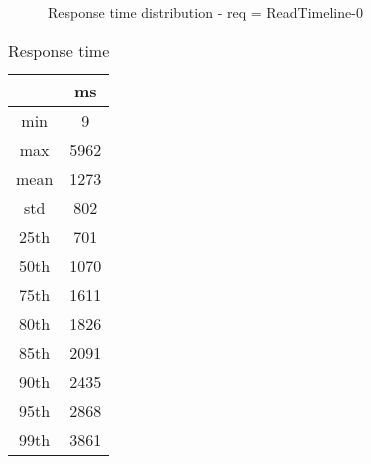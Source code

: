 \begin{minipage}{0.75\linewidth}
\begin{figure}[h]
\begin{adjustbox}{max width=1.0\linewidth, keepaspectratio}
  \end{adjustbox}
  \caption{Response time distribution - req = ReadTimeline-0}
\end{figure}
\end{minipage}\hfill\begin{minipage}{0.18\linewidth}
\begin{table}[h]
\begin{tabular}{|cc|}
\hline
\textbf{} & \textbf{ms}\\ \hline
 \Xhline{0.005\arrayrulewidth}
min & 9\\
 \Xhline{0.005\arrayrulewidth}
max & 5962\\
 \Xhline{0.005\arrayrulewidth}
mean & 1273\\
 \Xhline{0.005\arrayrulewidth}
std & 802\\
\hline
\hline
 \Xhline{0.005\arrayrulewidth}
25th & 701\\
 \Xhline{0.005\arrayrulewidth}
50th & 1070\\
 \Xhline{0.005\arrayrulewidth}
75th & 1611\\
 \Xhline{0.005\arrayrulewidth}
80th & 1826\\
 \Xhline{0.005\arrayrulewidth}
85th & 2091\\
 \Xhline{0.005\arrayrulewidth}
90th & 2435\\
 \Xhline{0.005\arrayrulewidth}
95th & 2868\\
 \Xhline{0.005\arrayrulewidth}
99th & 3861\\
\hline
\end{tabular}
\caption{Response time}
\end{table}
\end{minipage}\hfill
